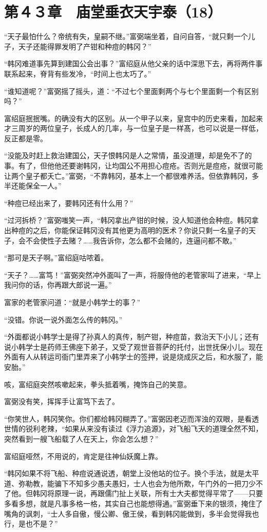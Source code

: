 \section{第４３章　庙堂垂衣天宇泰（18）}

“天子最怕什么？帝统有失，皇嗣不继。”富弼端坐着，自问自答，“就只剩一个儿子，天子还能得罪发明了产钳和种痘的韩冈？”

“韩冈难道事先算到建国公会出事？”富绍庭从他父亲的话中深思下去，再将两件事联系起来，脊背有些发冷，“时间上也太巧了。”

“谁知道呢？”富弼摇了摇头，道：“不过七个里面剩两个与七个里面剩一个有区别吗？”

富绍庭抿抿嘴。的确没有大的区别。从一个甲子以来，皇宫中的历史来看，加起来才三周岁的两位皇子，长成人的几率，与一位皇子是一样髙，也可以说是一样低，反正都是零。

“没能及时赶上救治建国公，天子恨韩冈是人之常情，虽没道理，却是免不了的事。有了，但他他还要谢韩冈，让均国公不用担心痘疮。否则光是痘疮，就很可能让两个皇子都夭亡。”富弼，“不靠韩冈，基本上一个都很难养活。但依靠韩冈，多半还能保全一人。”

“种痘已经出来了，要韩冈还有什么用？”

“过河拆桥？”富弼嗤笑一声，“韩冈拿出产钳的时候，没人知道他会种痘。韩冈拿出种痘的之后，你能保证韩冈没有其他更为高明的医术？你说只剩一名皇子的天子，会不会使性子去赌？……我告诉你，怎么都不会赌的，连逼问都不敢。”

“那可是天子啊。”富绍庭咕哝着。

“天子？……富笃！”富弼突然冲外面叫了一声，将服侍他的老管家叫了进来，“早上我问你的话，你再跟大郎说一遍。”

富家的老管家问道：“就是小韩学士的事？”

“没错。你说一说外面怎么传的韩冈。”

“外面都说小韩学士是得了孙真人的真传，制产钳，种痘苗，救治天下小儿；还有说小韩学士是药师王佛座下弟子，又受了观世音菩萨的托付，出世抚保小儿。现在外面有人从转运司衙门里弄来了小韩学士的签押，说是烧成灰之后，和水服了，能安胎。”

咳，富绍庭突然咳嗽起来，拳头抵着嘴，掩饰自己的笑意。

富弼没有笑，挥挥手让富笃下去了。

“你笑世人，韩冈笑你。你们都给韩冈糊弄了。”富弼因老迈而浑浊的双眼，是看透世情的锐利老辣，“如果从来没有读过《浮力追源》，对飞船飞天的道理全然不知，突然看到一艘飞船载了人在天上，你会怎么想？”

富绍庭哑然，不用说的，肯定是往神仙妖魔上靠。

“韩冈如果不将飞船、种痘说通说透，朝堂上没他站的位子。换个手法，就是太平道、弥勒教，能骗下不知多少愚夫愚妇，士人也会为他所欺，午门外的一把刀少不了他。但韩冈将原理一说，再跟儒门扯上关联，所有士大夫都觉得平常了——只要多看多想，就是凡事多格一格，其实自己也能想得通。”富弼垂下来的银须，掩住了嘴角的讽刺，“士人多自傲，慢公卿、傲王侯，看到韩冈能做到，多半会觉得我也行，是也不是？”

